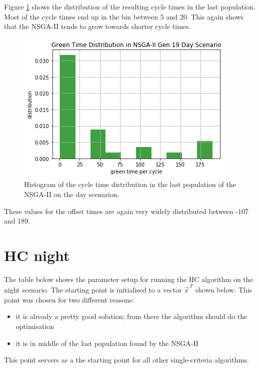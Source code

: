 \documentclass[./\jobname.tex]{subfiles}
\begin{document}
Figure \ref{fig:exp_nsga2_day_cycle_histo} shows the distribution of the resulting cycle times in the last population. Most of the cycle times end up in the bin between 5 and 20. This again shows that the NSGA-II tends to grow towards shorter cycle times. 


\begin{figure}[H]
	\centering
	\includegraphics[width=\textwidth]{../img/png/nsga2_day_cycl_distr.png}
	\caption{Histogram of the cycle time distribution in the last population of the NSGA-II on the day scenarion.}
	\label{fig:exp_nsga2_day_cycle_histo}
\end{figure}

These values for the offset times are again very widely distributed between -107 and 189.  


\section{HC night}

The table below shows the parameter setup for running the HC algorithm on the night scenario. The starting point is initialised to a vector  $\vec{x}^{\,T}$ shown below. This point was chosen for two different reasons: 

\begin{itemize}
	\item it is already a pretty good solution; from there the algorithm should do the optimisation
	\item it is in middle of the last population found by the NSGA-II
\end{itemize}

This point servers as a the starting point for all other single-criteria algorithms. 
\end{document}
